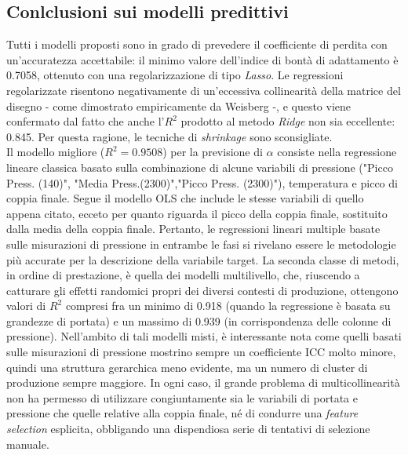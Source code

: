 \documentclass[fleqn,10pt]{SelfArx} %
\begin{document}
\subsection{Conlclusioni sui modelli predittivi}
Tutti i modelli proposti sono in grado di prevedere il coefficiente di perdita con un'accuratezza accettabile: il minimo valore dell'indice di bontà di adattamento è 0.7058, ottenuto con una regolarizzazione di tipo \textit{Lasso}. Le regressioni regolarizzate risentono negativamente di un'eccessiva collinearità della matrice del disegno - come dimostrato empiricamente da Weisberg \cite{Wei}\cite{Wei1} -, e questo viene confermato dal fatto che anche l'$R^2$ prodotto al metodo \textit{Ridge} non sia eccellente: 0.845. Per questa ragione, le tecniche di \textit{shrinkage} sono sconsigliate.\\
Il modello migliore ($R^2=0.9508$) per la previsione di $\alpha$ consiste nella regressione lineare classica basato sulla combinazione di alcune variabili di pressione ("Picco Press. (140)", "Media Press.(2300)","Picco Press. (2300)"), temperatura e picco di coppia finale. Segue il modello OLS che include le stesse variabili di quello appena citato, ecceto per quanto riguarda il picco della coppia finale, sostituito dalla media della coppia finale. Pertanto, le regressioni lineari multiple basate sulle misurazioni di pressione in entrambe le fasi si rivelano essere le metodologie più accurate per la descrizione della variabile target. La seconda classe di metodi, in ordine di prestazione, è quella dei modelli multilivello, che, riuscendo a catturare gli effetti randomici propri dei diversi contesti di produzione, ottengono valori di $R^2$ compresi fra un minimo di 0.918 (quando la regressione è basata su grandezze di portata) e un massimo di 0.939 (in corrispondenza delle colonne di pressione). Nell'ambito di tali modelli misti, è interessante nota come quelli basati sulle misurazioni di pressione mostrino sempre un coefficiente ICC molto minore, quindi una struttura gerarchica meno evidente, ma un numero di cluster di produzione sempre maggiore.
In ogni caso, il grande problema di multicollinearità non ha permesso di utilizzare congiuntamente sia le variabili di portata e pressione che quelle relative alla coppia finale, né di condurre una \textit{feature selection} esplicita, obbligando una dispendiosa serie di tentativi di selezione manuale. 
\end{document}
